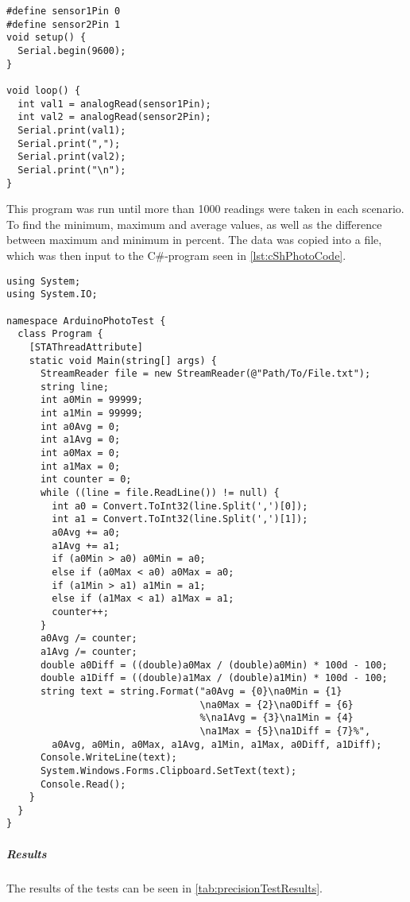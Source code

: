 \lstset{language=C}
\begin{lstlisting}[label = lst:arduinoPhotoCode, caption = Arduino program for photoresistor tests]
#define sensor1Pin 0
#define sensor2Pin 1
void setup() {
  Serial.begin(9600);
}

void loop() {
  int val1 = analogRead(sensor1Pin);
  int val2 = analogRead(sensor2Pin);
  Serial.print(val1);
  Serial.print(",");
  Serial.print(val2);
  Serial.print("\n");
}
\end{lstlisting}

This program was run until more than 1000 readings were taken in each scenario.
To find the minimum, maximum and average values, as well as the difference between maximum and minimum in percent. The data was copied into a file, which was then input to the C\#-program seen in \cref{lst:cShPhotoCode}.

\lstset{language=[Sharp]C}
\begin{lstlisting}[label = lst:cShPhotoCode, caption = C\# data processing code]
using System;
using System.IO;

namespace ArduinoPhotoTest {
  class Program {
    [STAThreadAttribute]
    static void Main(string[] args) {
      StreamReader file = new StreamReader(@"Path/To/File.txt");
      string line;
      int a0Min = 99999;
      int a1Min = 99999;
      int a0Avg = 0;
      int a1Avg = 0;
      int a0Max = 0;
      int a1Max = 0;
      int counter = 0;
      while ((line = file.ReadLine()) != null) {
        int a0 = Convert.ToInt32(line.Split(',')[0]);
        int a1 = Convert.ToInt32(line.Split(',')[1]);
        a0Avg += a0;
        a1Avg += a1;
        if (a0Min > a0) a0Min = a0;
        else if (a0Max < a0) a0Max = a0;
        if (a1Min > a1) a1Min = a1;
        else if (a1Max < a1) a1Max = a1;
        counter++;
      }
      a0Avg /= counter;
      a1Avg /= counter;
      double a0Diff = ((double)a0Max / (double)a0Min) * 100d - 100;
      double a1Diff = ((double)a1Max / (double)a1Min) * 100d - 100;
      string text = string.Format("a0Avg = {0}\na0Min = {1}
                                  \na0Max = {2}\na0Diff = {6}
                                  %\na1Avg = {3}\na1Min = {4}
                                  \na1Max = {5}\na1Diff = {7}%",
        a0Avg, a0Min, a0Max, a1Avg, a1Min, a1Max, a0Diff, a1Diff);
      Console.WriteLine(text);
      System.Windows.Forms.Clipboard.SetText(text);
      Console.Read();
    }
  }
}
\end{lstlisting}
\subparagraph{Results}
The results of the tests can be seen in \cref{tab:precisionTestResults}. 

